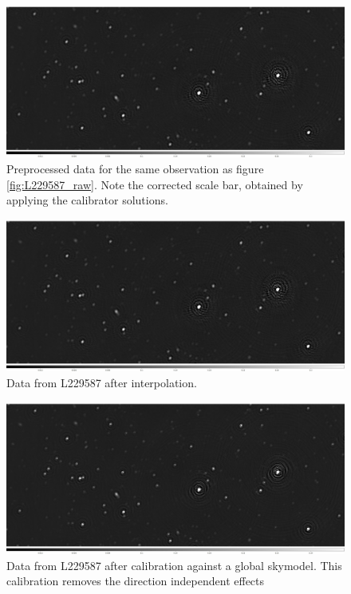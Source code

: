 \begin{figure}[h]
    \centering
    \includegraphics[width=.8\linewidth]{background/figures/prepcal_image.jpeg}
    \caption[Image of preprocessed data]{Preprocessed data for the same observation as figure \ref{fig:L229587_raw}. Note the corrected scale bar, obtained by applying the calibrator solutions.}
    \label{fig:L229587_prepcal}
\end{figure}



\begin{figure}[h]
    \centering
    \includegraphics[width=.8\linewidth]{background/figures/INTERP.jpeg}
    \caption[Image of concatenated data]{Data from L229587 after interpolation. }
    \label{fig:L229587_concat_aoflag}
\end{figure}


\begin{figure}[h]
    \centering
    \includegraphics[width=.8\linewidth]{background/figures/final_gsmacl.jpeg}
    \caption[Image of DI calibrated data]{Data from L229587 after calibration against a global skymodel. This calibration removes the direction independent effects}
    \label{fig:L229587_DI_cal}
\end{figure}

